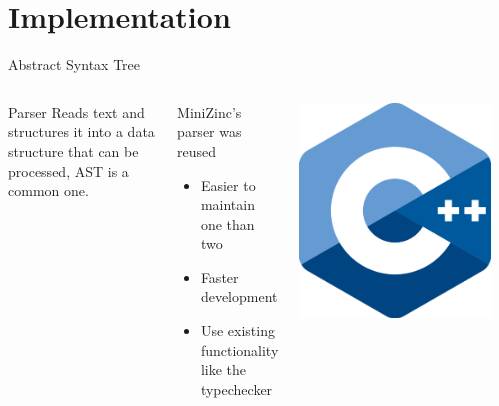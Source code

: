 \documentclass[aspectratio=169]{beamer} %
\begin{document}
\section{Implementation}
\begin{frame}{Abstract Syntax Tree}
  \begin{columns}
  \begin{block}{Parser}
    \pause Reads text and structures it into a data structure that can be processed, AST is a common one.
  \end{block}

  \pause
  \begin{block}{MiniZinc's parser was reused}
    \begin{itemize}
      \item Easier to maintain one than two
      \item Faster development
      \item Use existing functionality like the typechecker
    \end{itemize}
  \end{block}

  \pause
  \begin{center}
    \includegraphics[width=0.9\textwidth]{cpp.png}
  \end{center}
  \end{columns}
\end{frame}
\end{document}
